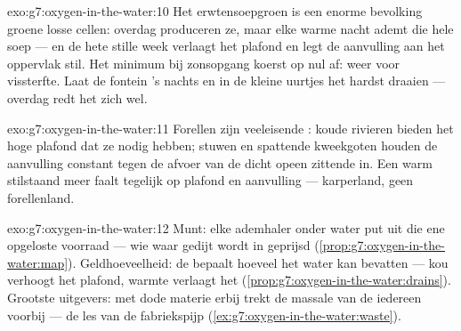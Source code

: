 \begin{solution}{exo:g7:oxygen-in-the-water:10}
Het erwtensoepgroen is een enorme bevolking groene losse cellen: overdag
produceren ze, maar elke warme nacht ademt die hele soep --- en de hete
stille week verlaagt het plafond en legt de aanvulling aan het oppervlak
stil. Het minimum bij zonsopgang koerst op nul af: weer voor vissterfte.
Laat de fontein 's nachts en in de kleine uurtjes het hardst draaien ---
overdag redt het zich wel.
\end{solution}

\begin{solution}{exo:g7:oxygen-in-the-water:11}
Forellen zijn veeleisende : koude rivieren bieden het hoge plafond
dat ze nodig hebben; stuwen en spattende kweekgoten houden de aanvulling
constant tegen de afvoer van de dicht opeen zittende  in. Een warm
stilstaand meer faalt tegelijk op plafond en aanvulling --- karperland,
geen forellenland.
\end{solution}

\begin{solution}{exo:g7:oxygen-in-the-water:12}
Munt: elke ademhaler onder water put uit die ene opgeloste voorraad ---
wie waar gedijt wordt in  geprijsd
(\cref{prop:g7:oxygen-in-the-water:map}). Geldhoeveelheid: de 
bepaalt hoeveel het water kan bevatten --- kou verhoogt het plafond,
warmte verlaagt het
(\cref{prop:g7:oxygen-in-the-water:drains}). Grootste uitgevers: met dode
materie erbij trekt de massale  van de  iedereen voorbij
--- de les van de fabriekspijp (\cref{ex:g7:oxygen-in-the-water:waste}).
\end{solution}

